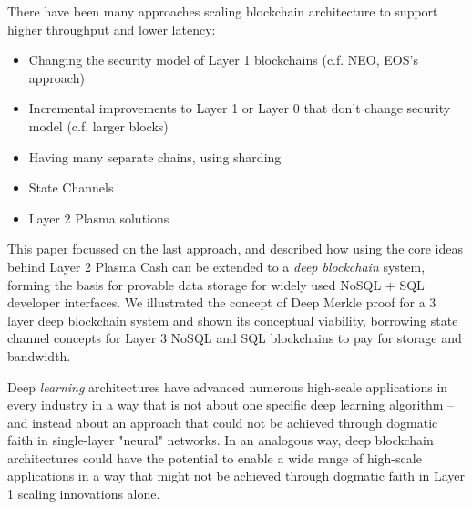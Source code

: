 \documentclass{article}
\begin{document}
There have been many approaches scaling blockchain architecture to support higher throughput and lower latency:

\begin{itemize}
\item Changing the security model of Layer 1 blockchains (c.f. NEO, EOS's approach)

\item Incremental improvements to Layer 1 or Layer 0 that don't change security model (c.f. larger blocks)

\item Having many separate chains, using sharding

\item State Channels

\item Layer 2 Plasma solutions
\end{itemize}

This paper focussed on the last approach, and described how using the core ideas behind Layer 2 Plasma Cash can be extended to a {\em deep blockchain} system, forming the basis for provable data storage for widely used NoSQL + SQL developer interfaces.  We illustrated the concept of Deep Merkle proof for a 3 layer deep blockchain system and shown its conceptual viability, borrowing state channel concepts for Layer 3 NoSQL and SQL blockchains to pay for storage and bandwidth.

Deep {\em learning} architectures have advanced numerous high-scale applications in every industry in a way that is not about one specific deep learning algorithm -- and instead about an approach that could not be achieved through dogmatic faith in single-layer "neural" networks.   In an analogous way, deep blockchain architectures could have the potential to enable a wide range of high-scale applications in a way that might not be achieved through dogmatic faith in Layer 1 scaling innovations alone.
\end{document}
